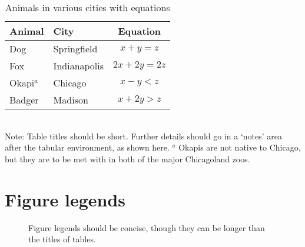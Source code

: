 \documentclass[11pt]{article}
\begin{document}
\begin{table}[h]
\caption{Animals in various cities with equations}
\label{Table:Okapi}
\centering
\begin{tabular}{llc}\hline
Animal    & City         & Equation \\ \hline
Dog       & Springfield  & $x+y=z$ \\
Fox       & Indianapolis & $2x+2y=2z$ \\
Okapi$^a$ & Chicago      & $x-y<z$ \\
Badger    & Madison      & $x+2y>z$ \\ \hline
\end{tabular}
\bigskip{}
\\
{\footnotesize Note: Table titles should be short. Further details 
should go in a `notes' area after the tabular environment, as shown 
here. $^a$ Okapis are not native to Chicago, but they are to be met with 
in both of the major Chicagoland zoos.}
\end{table}

\newpage{}


\section*{Figure legends}

\begin{figure}[h!]
\caption{Figure 
legends should be concise, though they can be longer than the titles of 
tables.}
\label{Fig:test}
\end{figure}


\end{document}
